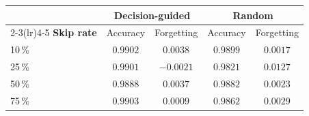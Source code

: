 \begin{tabular}{@{}lcccc@{}}
\toprule
& \multicolumn{2}{c}{\textbf{Decision-guided}} & \multicolumn{2}{c}{\textbf{Random}} \\
\cmidrule(lr){2-3}\cmidrule(lr){4-5}
\textbf{Skip rate} & Accuracy & Forgetting & Accuracy & Forgetting \\
\midrule
10\,\% & $0.9902$ & $0.0038$ & $0.9899$ & $0.0017$ \\
25\,\% & $0.9901$ & $-0.0021$ & $0.9821$ & $0.0127$ \\
50\,\% & $0.9888$ & $0.0037$ & $0.9882$ & $0.0023$ \\
75\,\% & $0.9903$ & $0.0009$ & $0.9862$ & $0.0029$ \\
\bottomrule
\end{tabular}
